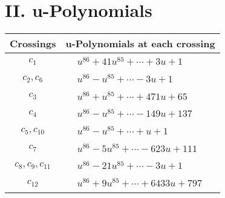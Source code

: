 \documentclass[1p]{elsarticle_modified}
\theoremstyle{definition}
\begin{document}
\newpage\renewcommand{\arraystretch}{1}
\centering \section*{ II. u-Polynomials}
\begin{tabular}{m{50pt}|m{274pt}}
Crossings & \hspace{64pt}u-Polynomials at each crossing \\
\hline $$\begin{aligned}c_{1}\end{aligned}$$&$\begin{aligned}
&u^{86}+41 u^{85}+\cdots+3 u+1
\end{aligned}$\\
\hline $$\begin{aligned}c_{2},c_{6}\end{aligned}$$&$\begin{aligned}
&u^{86}- u^{85}+\cdots-3 u+1
\end{aligned}$\\
\hline $$\begin{aligned}c_{3}\end{aligned}$$&$\begin{aligned}
&u^{86}+u^{85}+\cdots+471 u+65
\end{aligned}$\\
\hline $$\begin{aligned}c_{4}\end{aligned}$$&$\begin{aligned}
&u^{86}- u^{85}+\cdots-149 u+137
\end{aligned}$\\
\hline $$\begin{aligned}c_{5},c_{10}\end{aligned}$$&$\begin{aligned}
&u^{86}- u^{85}+\cdots+u+1
\end{aligned}$\\
\hline $$\begin{aligned}c_{7}\end{aligned}$$&$\begin{aligned}
&u^{86}-5 u^{85}+\cdots-623 u+111
\end{aligned}$\\
\hline $$\begin{aligned}c_{8},c_{9},c_{11}\end{aligned}$$&$\begin{aligned}
&u^{86}-21 u^{85}+\cdots-3 u+1
\end{aligned}$\\
\hline $$\begin{aligned}c_{12}\end{aligned}$$&$\begin{aligned}
&u^{86}+9 u^{85}+\cdots+6433 u+797
\end{aligned}$\\
\hline
\end{tabular}\newpage\renewcommand{\arraystretch}{1}
\end{document}
